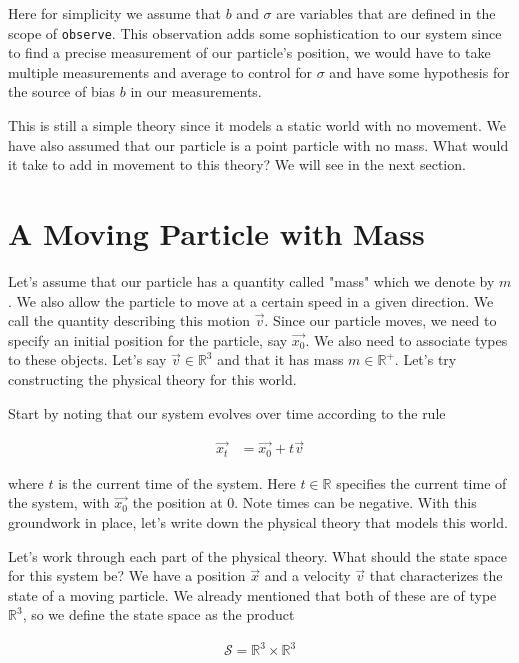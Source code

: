 \documentclass[book.tex]{subfiles}
\begin{document}
Here for simplicity we assume that $b$ and $\sigma$ are variables that are defined in the scope of \lstinline{observe}. This observation adds some sophistication to our system since to find a precise measurement of our particle's position, we would have to take multiple measurements and average to control for $\sigma$ and have some hypothesis for the source of bias $b$ in our measurements.

This is still a simple theory since it models a static world with no movement. We have also assumed that our particle is a point particle with no mass. What would it take to add in movement to this theory? We will see in the next section.

\section{A Moving Particle with Mass}

Let's assume that our particle has a quantity called "mass" which we denote by $m$. We also allow the particle to move at a certain speed in a given direction. We call the quantity describing this motion $\vec{v}$. Since our particle moves, we need to specify an initial position for the particle, say $\vec{x_0}$. We also need to associate types to these objects. Let's say $\vec{v} \in \mathbb{R}^3$ and that it has mass $m \in \mathbb{R}^+$. Let's try constructing the physical theory for this world.

Start by noting that our system evolves over time according to the rule

\begin{align}
\label{newton:move_particle}
\vec{x_t} &= \vec{x_0} + t \vec{v}
\end{align}

\noindent where $t$ is the current time of the system. Here $t \in \mathbb{R}$ specifies the current time of the system, with $\vec{x_0}$ the position at $0$. Note times can be negative. With this groundwork in place, let's write down the physical theory that models this world.

Let's work through each part of the physical theory. What should the state space for this system be? We have a position $\vec{x}$ and a velocity $\vec{v}$ that characterizes the state of a moving particle. We already mentioned that both of these are of type $\mathbb{R}^3$, so we define the state space as the product 

\begin{align}
    \mathcal{S} = \mathbb{R}^3 \times \mathbb{R}^3
\end{align}
\end{document}
